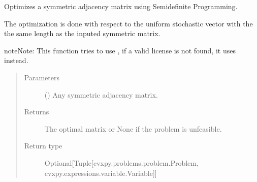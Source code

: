 \documentclass[letterpaper,10pt,english]{sphinxmanual}
\begin{document}
\begin{fulllineitems}
\label{\detokenize{app.domain.helpers:app.domain.helpers.matrices._adjency_matrix_sdp_optimization}}
Optimizes a symmetric adjacency matrix using Semidefinite Programming.

The optimization is done with respect to the uniform stochastic vector
with the the same length as the inputed symmetric matrix.

\begin{sphinxadmonition}{note}{Note:}
This function tries to use
,
if a valid license is not found, it uses
 instead.
\end{sphinxadmonition}
\begin{quote}\begin{description}
\item[{Parameters}] \leavevmode
{} () \textendash{} Any symmetric adjacency matrix.

\item[{Returns}] \leavevmode
The optimal matrix or None if the problem is unfeasible.

\item[{Return type}] \leavevmode
Optional{[}Tuple{[}cvxpy.problems.problem.Problem, cvxpy.expressions.variable.Variable{]}{]}

\end{description}\end{quote}

\end{fulllineitems}

\end{document}
